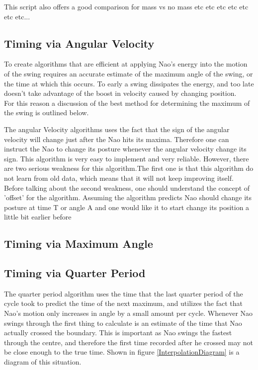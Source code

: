 \documentclass[11pt]{article}
\newcommand*\ruleline[1]{\par\noindent\raisebox{.8ex}{\makebox[\linewidth]{\hrulefill\hspace{1ex}\raisebox{-.8ex}{#1}\hspace{1ex}\hrulefill}}}
\begin{document}
This script also offers a good comparison for mass vs no mass etc etc etc etc etc etc etc...



\subsection{Timing via Angular Velocity}
\ruleline{George Sheppard}
To create algorithms that are efficient at applying Nao's energy into the motion of the swing requires an accurate estimate of the maximum angle of the swing, or the time at which this occurs. To early a swing dissipates the energy, and too late doesn't take advantage of the boost in velocity caused by changing position.\\
For this reason a discussion of the best method for determining the maximum of the swing is outlined below.

\ruleline{Chenglong Li}
The angular Velocity algorithms uses the fact that the sign of the angular velocity will change just after the Nao hits its maxima. Therefore one can instruct the Nao to change its posture whenever the angular velocity change its sign. This algorithm is very easy to implement and very reliable. However, there are two serious weakness for this algorithm.The first one is that this algorithm do not learn from old data, which means that it will not keep improving itself. Before talking about the second weakness, one should understand the concept of 'offset' for the algorithm. Assuming the algorithm predicts Nao should change its posture at time T or angle A and one would like it to start change its position a little bit earlier before  

\subsection{Timing via Maximum Angle}
\subsection{Timing via Quarter Period}
\ruleline{George Sheppard}
The quarter period algorithm uses the time that the last quarter period of the cycle took to predict the time of the next maximum, and utilizes the fact that Nao's motion only increases in angle by a small amount per cycle. Whenever Nao swings through the first thing to calculate is an estimate of the time that Nao actually crossed the boundary. This is important as Nao swings the fastest through the centre, and therefore the first time recorded after he crossed may not be close enough to the true time. Shown in figure \ref{InterpolationDiagram} is a diagram of this situation. 
\end{document}
